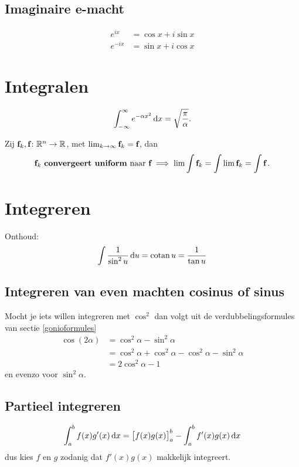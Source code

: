 \documentclass{article}
\begin{document}
	\subsection{Imaginaire e-macht}

	\begin{align*}
		e^{ix} &= \cos x + i \sin x \\
		e^{-ix} &= \sin x + i \cos x
	\end{align*}
 		
 	\section{Integralen}

		\begin{stelling}
			\[ \int_{-\infty}^\infty e^{-\alpha x^2} \mathop{}\!\mathrm{d} x = \sqrt {\frac \pi \alpha}.\]
		\end{stelling}

	 	\begin{stelling}
		 	Zij ${\textbf{f}}_k,{\textbf{f}} \colon \mathbb{R}^n \to \mathbb{R}$, met $\lim_{k \to \infty} {\textbf{f}}_k = {\textbf{f}}$, dan
		 	\[ {\textbf{f}}_k \text { \textbf{convergeert uniform} naar } {\textbf{f}} \implies \lim \int {\textbf{f}}_k = \int \lim {\textbf{f}}_k = \int {\textbf{f}} \,. \]
	 	\end{stelling}
	 	
	\section{Integreren}
        Onthoud:
        \begin{align*}
            \int \frac{1}{\sin^2 u} \mathop{}\!\mathrm{d} u = \operatorname{\mathop{cotan}} u = \frac{1}{\tan u}
        \end{align*}

		\subsection{Integreren van even machten cosinus of sinus}
		Mocht je iets willen integreren met $\cos^2$ dan volgt uit de verdubbelingsformules van sectie \ref{gonioformules}
 		 \begin{align*}
				  \cos (2\alpha) &= \cos^2 \alpha - \sin^2 \alpha \\
 		 		 &=  \cos^2 \alpha + \cos^2 \alpha - \cos^2 \alpha - \sin^2 \alpha \\
 		 		 &= 2\cos^2 \alpha -1
 		 	 \end{align*}
 		 	 en evenzo voor $\sin^2 \alpha$.

        \subsection{Partieel integreren}
            \[
                \int_a^b f(x) g'(x) \mathop{}\!\mathrm{d} x = \big[f(x)g(x)\big]_a^b - \int_a^b f'(x) g(x) \mathop{}\!\mathrm{d} x
             \]
             dus kies $f$ en $g$ zodanig dat $f'(x)g(x)$ makkelijk integreert.
\end{document}
